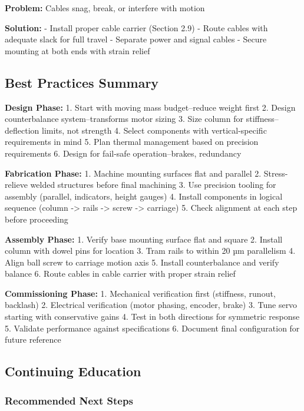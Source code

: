 \documentclass[
]{article}
\begin{document}
\textbf{Problem:} Cables snag, break, or interfere with motion

\textbf{Solution:} - Install proper cable carrier (Section 2.9) - Route
cables with adequate slack for full travel - Separate power and signal
cables - Secure mounting at both ends with strain relief

\subsection{Best Practices Summary}\label{best-practices-summary}

\textbf{Design Phase:} 1. Start with moving mass budget--reduce weight
first 2. Design counterbalance system--transforms motor sizing 3. Size
column for stiffness--deflection limits, not strength 4. Select
components with vertical-specific requirements in mind 5. Plan thermal
management based on precision requirements 6. Design for fail-safe
operation--brakes, redundancy

\textbf{Fabrication Phase:} 1. Machine mounting surfaces flat and
parallel 2. Stress-relieve welded structures before final machining 3.
Use precision tooling for assembly (parallel, indicators, height gauges)
4. Install components in logical sequence (column -\textgreater{} rails
-\textgreater{} screw -\textgreater{} carriage) 5. Check alignment at
each step before proceeding

\textbf{Assembly Phase:} 1. Verify base mounting surface flat and square
2. Install column with dowel pins for location 3. Tram rails to within
20 µm parallelism 4. Align ball screw to carriage motion axis 5. Install
counterbalance and verify balance 6. Route cables in cable carrier with
proper strain relief

\textbf{Commissioning Phase:} 1. Mechanical verification first
(stiffness, runout, backlash) 2. Electrical verification (motor phasing,
encoder, brake) 3. Tune servo starting with conservative gains 4. Test
in both directions for symmetric response 5. Validate performance
against specifications 6. Document final configuration for future
reference

\subsection{Continuing Education}\label{continuing-education}

\subsubsection{Recommended Next Steps}\label{recommended-next-steps}
\end{document}
